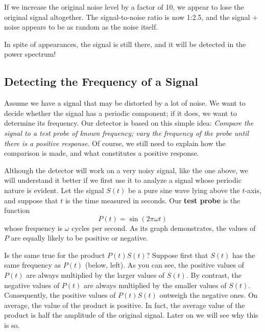 {{{{\newpage

	If we increase the original noise level 
by a factor of 10, we appear to lose the original signal altogether.  The signal-to-noise ratio is now 1:2.5, and the signal + noise appears to be as random as the noise itself.
\linebreak

\vspace{20pt}



\vspace{265pt}

\noindent
In spite of appearances, the signal is still there, and it will be detected in the power spectrum! 


\subsection{Detecting the Frequency of a Signal}

	Assume we have a signal that may be distorted by a lot of noise.  
We want to decide whether the signal has a periodic component; if it does, we want to determine its frequency.  Our detector is based on this simple idea: {\em Compare the signal to a test probe of known frequency; vary the frequency of the probe until there is a positive response}.  Of course, we still need to explain how the comparison is made, and what constitutes a positive response.  
	
	Although the detector will work on a very noisy signal, like the one above, we will understand it better if we first use it to analyze a signal whose periodic nature is evident.  Let the signal $S(t)$ be a pure sine wave lying above the $t$-axis, and suppose that $t$ is the time measured in seconds.  
Our {\bf test probe} is the function
	\[
P(t) = \sin(2\pi \omega t)
\]
whose frequency is $\omega$ cycles per second.  As its graph demonstrates, the values of $P$ are equally likely to be positive or negative.  

	Is the same true for the product $P(t)S(t)$?  
Suppose first that $S(t)$ has the same frequency as $P(t)$ (below, left).  As you can see, the positive values of $P(t)$ are always multiplied by the larger values of $S(t)$.  By contrast, the negative values of $P(t)$ are always multiplied by the smaller values of $S(t)$.  Consequently, the positive values of $P(t)S(t)$ outweigh the negative ones.  On average, the value of the product is positive.   In fact, the average value of the product is half the amplitude of the original signal. \label{frequencies match}  Later on we will see why this is so.  
\vspace{80pt}

}}}}
